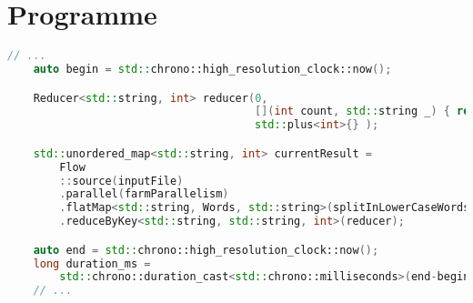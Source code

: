 \newpage
\section{Programme }
\label{appendice-code-wordcount-f.ann}
\begin{lstlisting}[basicstyle=\ttfamily\footnotesize,language=c++]
	// ...
    auto begin = std::chrono::high_resolution_clock::now();

    Reducer<std::string, int> reducer(0, 
                                      [](int count, std::string _) { return count + 1; },
                                      std::plus<int>{} );

    std::unordered_map<std::string, int> currentResult = 
        Flow
        ::source(inputFile)
        .parallel(farmParallelism)
        .flatMap<std::string, Words, std::string>(splitInLowerCaseWords)
        .reduceByKey<std::string, std::string, int>(reducer);  

    auto end = std::chrono::high_resolution_clock::now();
    long duration_ms = 
        std::chrono::duration_cast<std::chrono::milliseconds>(end-begin).count();
	// ...
\end{lstlisting}
